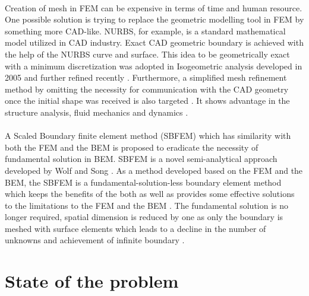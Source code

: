 \paragraph{}
Creation of mesh in FEM can be expensive in terms of time and human resource.
One possible solution is trying to replace the geometric modelling tool in FEM by something more CAD-like.
NURBS, for example, is a standard mathematical model utilized in CAD industry.
Exact CAD geometric boundary is achieved with the help of the NURBS curve and surface.
This idea to be geometrically exact with a minimum discretization was adopted in Isogeometric analysis developed in 2005 \citep{Hug2005b} and further refined recently \citep{Zhang2007,Hug2005b,Cot2006,Cot2009,Baz2006a,Baz2006b}.
Furthermore, a simplified mesh refinement method by omitting the necessity for communication with the CAD geometry once the initial shape was received is also targeted \citep{Cot2007}.
It shows advantage in the structure analysis, fluid mechanics \citep{Buf2011} and dynamics \citep{Cot2006}.

\paragraph{}
A Scaled Boundary finite element method (SBFEM) which has similarity with both the FEM and the BEM is proposed to eradicate the necessity of fundamental solution in BEM.
SBFEM is a novel semi-analytical approach developed by Wolf and Song \citep{Wol1999}.
As a method developed based on the FEM and the BEM, the SBFEM is a fundamental-solution-less boundary element method which keeps the benefits of the both as well as provides some effective solutions to the limitations to the FEM and the BEM \citep{Wol1999}.
The fundamental solution is no longer required, spatial dimension is reduced by one as only the boundary is meshed with surface elements which leads to a decline in the number of unknowns and achievement of infinite boundary \citep{Wol2003}.


\section{State of the problem}
\label{intro_sec:problem}
